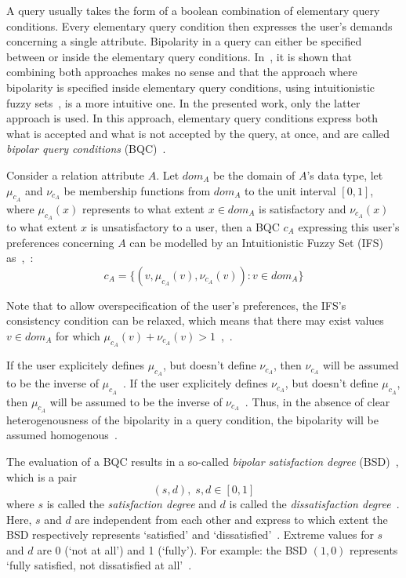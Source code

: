 \documentclass[runningheads,a4paper]{llncs}
\begin{document}
A query usually takes the form of a boolean combination of elementary query conditions. Every elementary query condition then expresses the user's demands concerning a single attribute. Bipolarity in a query can either be specified between or inside the elementary query conditions. In~\cite{Matthe2011ijis}, it is shown that combining both approaches makes no sense and that the approach where bipolarity is specified inside elementary query conditions, using intuitionistic fuzzy sets~\cite{Atanassov1986fss}, is a more intuitive one. In the presented work, only the latter approach is used. In this approach, elementary query conditions express both what is accepted and what is not accepted by the query, at once, and are called \emph{bipolar query conditions} (BQC)~\cite{Matthe2011ijis}.

Consider a relation attribute $A$. Let $dom_{A}$ be the domain of $A$'s data type, let $\mu_{c_{A}}$ and $\nu_{c_{A}}$ be membership functions from $dom_{A}$ to the unit interval $\left[0, 1\right]$, where $\mu_{c_{A}}(x)$ represents to what extent $x \in dom_{A}$ is satisfactory and $\nu_{c_{A}}(x)$ to what extent $x$ is unsatisfactory to a user, then a BQC $c_{A}$ expressing this user's preferences concerning $A$ can be modelled by an Intuitionistic Fuzzy Set (IFS)~\cite{Atanassov1986fss} as~\cite{DeTre2010ieeetfs},~\cite{Matthe2011ijis}:
\vspace{-5pt}
\begin{equation}
c_{A} = \{(v, \mu_{c_{A}}(v), \nu_{c_{A}}(v)) : v \in dom_{A}\}
\end{equation}

Note that to allow overspecification of the user's preferences, the IFS's consistency condition can be relaxed, which means that there may exist values $v \in dom_{A}$ for which $\mu_{c_{A}}(v) + \nu_{c_{A}}(v) > 1$~\cite{DeTre2010ieeetfs},~\cite{Matthe2011ijis}.

If the user explicitely defines $\mu_{c_{A}}$, but doesn't define $\nu_{c_{A}}$, then $\nu_{c_{A}}$ will be assumed to be the inverse of $\mu_{c_{A}}$~\cite{Matthe2011ijis}. If the user explicitely defines $\nu_{c_{A}}$, but doesn't define $\mu_{c_{A}}$, then $\mu_{c_{A}}$ will be assumed to be the inverse of $\nu_{c_{A}}$~\cite{Matthe2011ijis}. Thus, in the absence of clear heterogenousness of the bipolarity in a query condition, the bipolarity will be assumed homogenous~\cite{Matthe2011ijis}.

The evaluation of a BQC results in a so-called {\em bipolar satisfaction degree} (BSD)~\cite{Matthe2011ijis}, which is a pair
\vspace{-10pt}
\begin{equation}
(s,d),\; s,d \in [0,1] \nonumber
\end{equation}
where $s$ is called the \emph{satisfaction degree} and $d$ is called the \emph{dissatisfaction degree}~\cite{Matthe2011ijis}. Here, $s$ and $d$ are independent from each other and express to which extent the BSD respectively represents `satisfied' and `dissatisfied'~\cite{Matthe2011ijis}. Extreme values for $s$ and $d$ are 0 (`not at all') and 1 (`fully'). For example: the BSD $(1,0)$ represents `fully satisfied, not dissatisfied at all'~\cite{Matthe2011ijis}.
\end{document}
